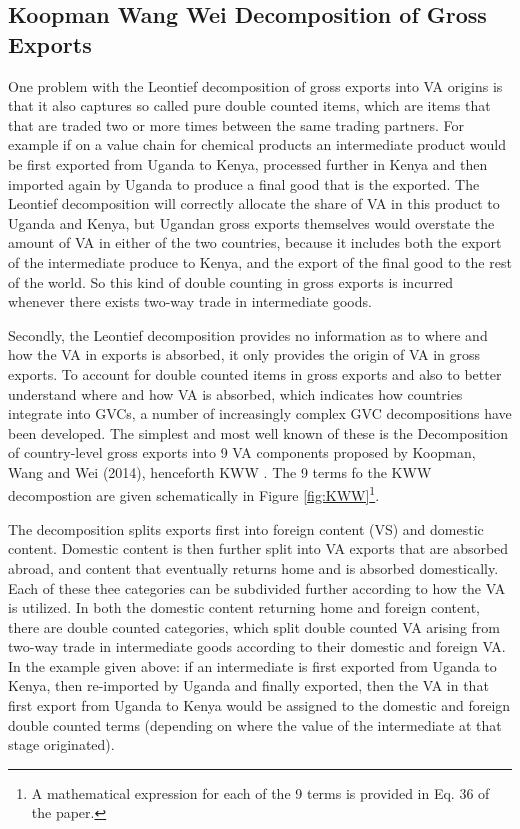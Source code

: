 \documentclass[a4paper]{article}
\begin{document}
\subsection{Koopman Wang Wei Decomposition of Gross Exports}
One problem with the Leontief decomposition of gross exports into VA origins is that it also captures so called pure double counted items, which are items that that are traded two or more times between the same trading partners. For example if on a value chain for chemical products an intermediate product would be first exported from Uganda to Kenya, processed further in Kenya and then imported again by Uganda to produce a final good that is the exported. The Leontief decomposition will correctly allocate the share of VA in this product to Uganda and Kenya, but Ugandan gross exports themselves would overstate the amount of VA in either of the two countries, because it includes both the export of the intermediate produce to Kenya, and the export of the final good to the rest of the world. So this kind of double counting in gross exports is incurred whenever there exists two-way trade in intermediate goods. \newline

Secondly, the Leontief decomposition provides no information as to where and how the VA in exports is absorbed, it only provides the origin of VA in gross exports. To account for double counted items in gross exports and also to better understand where and how VA is absorbed, which indicates how countries integrate into GVCs, a number of increasingly complex GVC decompositions have been developed. The simplest and most well known of these is the Decomposition of country-level gross exports into 9 VA components proposed by Koopman, Wang and Wei (2014), henceforth KWW \citep{koopman2014tracing}. The 9 terms fo the KWW decompostion are given schematically in Figure \ref{fig:KWW}\footnote{A mathematical expression for each of the 9 terms is provided in Eq. 36 of the \citet{koopman2014tracing} paper.}. \newline

The decomposition splits exports first into foreign content (VS) and domestic content. Domestic content is then further split into VA exports that are absorbed abroad, and content that eventually returns home and is absorbed domestically. Each of these thee categories can be subdivided further according to how the VA is utilized. In both the domestic content returning home and foreign content, there are double counted categories, which split double counted VA arising from two-way trade in intermediate goods according to their domestic and foreign VA. In the example given above: if an intermediate is first exported from Uganda to Kenya, then re-imported by Uganda and finally exported, then the VA in that first export from Uganda to Kenya would be assigned to the domestic and foreign double counted terms (depending on where the value of the intermediate at that stage originated). 
\end{document}
